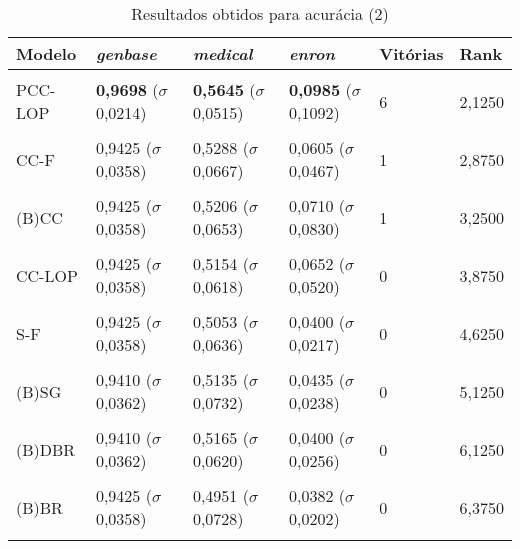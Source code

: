 \begin{table}[htbp]
	\centering
	\caption{Resultados obtidos para acurácia (2)}
		\begin{tabular}
        { p{0.88in} p{0.88in} p{0.88in} p{0.88in} p{0.88in} p{0.88in} }
        
        \hline
Modelo & \textit{genbase} & \textit{medical} & \textit{enron} & \textbf{Vitórias} & \textbf{Rank} \\ 
\hline \\

PCC-LOP & \textbf{0,9698} \newline ($\sigma$ 0,0214) & \textbf{0,5645} \newline ($\sigma$ 0,0515) & \textbf{0,0985} \newline ($\sigma$ 0,1092) & 6 & 2,1250 \\ \\
CC-F & 0,9425 \newline ($\sigma$ 0,0358) & 0,5288 \newline ($\sigma$ 0,0667) & 0,0605 \newline ($\sigma$ 0,0467) & 1 & 2,8750 \\ \\
(B)CC & 0,9425 \newline ($\sigma$ 0,0358) & 0,5206 \newline ($\sigma$ 0,0653) & 0,0710 \newline ($\sigma$ 0,0830) & 1 & 3,2500 \\ \\
CC-LOP & 0,9425 \newline ($\sigma$ 0,0358) & 0,5154 \newline ($\sigma$ 0,0618) & 0,0652 \newline ($\sigma$ 0,0520) & 0 & 3,8750 \\ \\
S-F & 0,9425 \newline ($\sigma$ 0,0358) & 0,5053 \newline ($\sigma$ 0,0636) & 0,0400 \newline ($\sigma$ 0,0217) & 0 & 4,6250 \\ \\
(B)SG & 0,9410 \newline ($\sigma$ 0,0362) & 0,5135 \newline ($\sigma$ 0,0732) & 0,0435 \newline ($\sigma$ 0,0238) & 0 & 5,1250 \\ \\
(B)DBR & 0,9410 \newline ($\sigma$ 0,0362) & 0,5165 \newline ($\sigma$ 0,0620) & 0,0400 \newline ($\sigma$ 0,0256) & 0 & 6,1250 \\ \\
(B)BR & 0,9425 \newline ($\sigma$ 0,0358) & 0,4951 \newline ($\sigma$ 0,0728) & 0,0382 \newline ($\sigma$ 0,0202) & 0 & 6,3750 \\ \\


\end{tabular}
\end{table}
